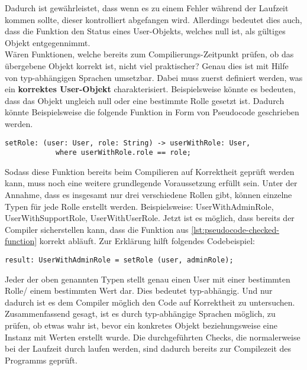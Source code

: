 Dadurch ist gewährleistet, dass wenn es zu einem Fehler während der Laufzeit kommen sollte, dieser kontrolliert abgefangen wird. Allerdings bedeutet dies auch, dass die Funktion den Status eines User-Objekts, welches null ist, als gültiges Objekt entgegennimmt.\\
Wären Funktionen, welche bereits zum Compilierungs-Zeitpunkt prüfen, ob das übergebene Objekt korrekt ist, nicht viel praktischer? Genau dies ist mit Hilfe von typ-abhängigen Sprachen umsetzbar. Dabei muss zuerst definiert werden, was ein \textbf{korrektes User-Objekt} charakterisiert. Beispielsweise könnte es bedeuten, dass das Objekt ungleich null oder eine bestimmte Rolle gesetzt ist. Dadurch könnte Beispielsweise die folgende Funktion in Form von Pseudocode geschrieben werden.
\begin{lstlisting}[language=coq,firstnumber=1,caption=Pseudocode Check auf null des User Objektes,label=lst:pseudocode-checked-function]
setRole: (user: User, role: String) -> userWithRole: User,
			where userWithRole.role == role;
\end{lstlisting}
Sodass diese Funktion bereits beim Compilieren auf Korrektheit geprüft werden kann, muss noch eine weitere grundlegende Voraussetzung erfüllt sein.
Unter der Annahme, dass es insgesamt nur drei verschiedene Rollen gibt, können einzelne Typen für jede Rolle erstellt werden. Beispielsweise: UserWithAdminRole, UserWithSupportRole, UserWithUserRole. 
Jetzt ist es möglich, dass bereits der Compiler sicherstellen kann, dass die Funktion aus \ref{lst:pseudocode-checked-function} korrekt abläuft. Zur Erklärung hilft folgendes Codebeispiel:
\begin{lstlisting}[language=coq,firstnumber=1,caption=Pseudocode Check auf null des User Objektes,label=lst:pseudocode-checked-function-usage]
result: UserWithAdminRole = setRole (user, adminRole);
\end{lstlisting}
Jeder der oben genannten Typen stellt genau einen User mit einer bestimmten Rolle/ einem bestimmten Wert dar. Dies bedeutet typ-abhängig. Und nur dadurch ist es dem Compiler möglich den Code auf Korrektheit zu untersuchen.\cite{MARTIN01:FV}
Zusammenfassend gesagt, ist es durch typ-abhängige Sprachen möglich, zu prüfen, ob etwas wahr ist, bevor ein konkretes Objekt beziehungsweise eine Instanz mit Werten erstellt wurde. Die durchgeführten Checks, die normalerweise bei der Laufzeit durch laufen werden, sind dadurch bereits zur Compilezeit des Programms geprüft.\\
\\
